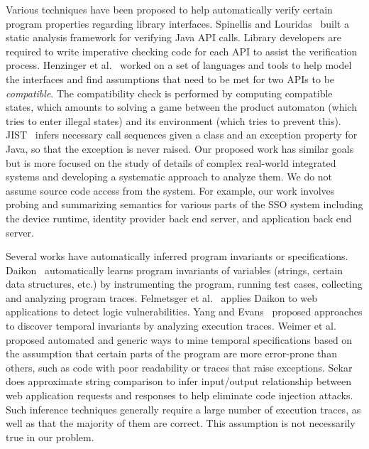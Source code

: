 Various techniques have been proposed to help automatically verify certain program properties regarding library interfaces.  Spinellis and Louridas~\cite{Spinellis:2007:FSV:1244490.1244957} built a static analysis framework for verifying Java API calls.  Library developers are required to write imperative checking code for each API to assist the verification process.  Henzinger et al.~\cite{deAlfaro:2001:IA:503209.503226,Beyer:2005:WSI:1060745.1060770} worked on a set of languages and tools to help model the interfaces and find assumptions that need to be met for two APIs to be \emph{compatible}.  The compatibility check is performed by computing compatible states, which amounts to solving a game between the product automaton (which tries to enter illegal states) and its environment (which tries to prevent this).  JIST~\cite{Alur:2005:SIS:1040305.1040314} infers necessary call sequences given a class and an exception property for Java, so that the exception is never raised.  Our proposed work has similar goals but is more focused on the study of details of complex real-world integrated systems and developing a systematic approach to analyze them.  We do not assume source code access from the system.  For example, our work involves probing and summarizing semantics for various parts of the SSO system including the device runtime, identity provider back end server, and application back end server.

Several works have automatically inferred program invariants or specifications.  Daikon~\cite{ErnstGKN99,Ernst2000:PhD,ErnstCGN2001:TSE} automatically learns program invariants of variables (strings, certain data structures, etc.) by instrumenting the program, running test cases, collecting and analyzing program traces.  Felmetsger et al.~\cite{Felmetsger:2010:TAD:1929820.1929834} applies Daikon to web applications to detect logic vulnerabilities.  Yang and Evans~\cite{Yang:2004:DIT:996821.996832, Yang:2006:PMT:1134285.1134325} proposed approaches to discover temporal invariants by analyzing execution traces.  Weimer et al.~\cite{Weimer05miningtemporal,LeGoues:2012:MCQ:2122269.2122550} proposed automated and generic ways to mine temporal specifications based on the assumption that certain parts of the program are more error-prone than others, such as code with poor readability or traces that raise exceptions.  Sekar~\cite{DBLP:conf:ndss:Sekar09} does approximate string comparison to infer input/output relationship between web application requests and responses to help eliminate code injection attacks.  Such inference techniques generally require a large number of execution traces, as well as that the majority of them are correct.  This assumption is not necessarily true in our problem.  

